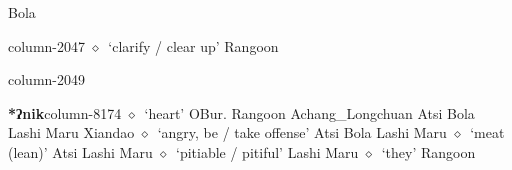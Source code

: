          Bola 
  \item {\footnotesize \textbf{}}{\tiny column-2047}
         $\diamond$~`clarify / clear up'
         Rangoon 
  \item {\footnotesize \textbf{}}{\tiny column-2049}
  \item {\footnotesize \textbf{*ʔnik}}{\tiny column-8174}
         $\diamond$~`heart'
         OBur. 
\hspace{1ex}
         Rangoon 
\hspace{1ex}
         Achang\_Longchuan 
\hspace{1ex}
         Atsi 
\hspace{1ex}
         Bola 
\hspace{1ex}
         Lashi 
\hspace{1ex}
         Maru 
\hspace{1ex}
         Xiandao 
\hspace{1ex}
         $\diamond$~`angry, be / take offense'
         Atsi 
\hspace{1ex}
         Bola 
\hspace{1ex}
         Lashi 
\hspace{1ex}
         Maru 
\hspace{1ex}
         $\diamond$~`meat (lean)'
         Atsi 
\hspace{1ex}
         Lashi 
\hspace{1ex}
         Maru 
\hspace{1ex}
         $\diamond$~`pitiable / pitiful'
         Lashi 
\hspace{1ex}
         Maru 
\hspace{1ex}
         $\diamond$~`they'
         Rangoon 

